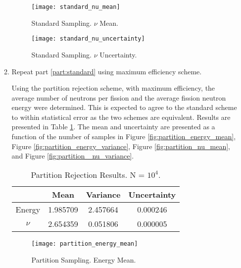 \documentclass{article}
\begin{document}
\begin{enumerate}
\begin{enumerate}
        
        \begin{figure}[H]
          \centering
          \texttt{[image: standard\_nu\_mean]}
          \caption{Standard Sampling. $\nu$ Mean.}
          \label{fig:standard_nu_mean}
        \end{figure}

        \begin{figure}[H]
          \centering
          \texttt{[image: standard\_nu\_uncertainty]}
          \caption{Standard Sampling. $\nu$ Uncertainty.}
          \label{fig:standard_nu_uncertainty}
        \end{figure}

      \item Repeat part \ref{part:standard} using maximum efficiency scheme.
      
        Using the partition rejection scheme, with maximum efficiency, 
        the average number of neutrons per fission and the average fission 
        neutron energy were determined. This is expected to agree to the 
        standard scheme to within statistical error as the two schemes are 
        equivalent. Results are presented in Table \ref{tab:partition}. The 
        mean and uncertainty are presented as a function of the number 
        of samples in Figure \ref{fig:partition_energy_mean}, Figure 
        \ref{fig:partition_energy_variance}, Figure \ref{fig:partition_nu_mean},
        and Figure \ref{fig:partition _nu_variance}. 
        
        \begin{table}[H]
          \caption{Partition Rejection Results. N = $10^4$.}
          \label{tab:partition}
          \begin{center}
          \begin{tabular}{cccc}
            & Mean & Variance & Uncertainty \\
            \midrule
            Energy & 1.985709&  2.457664&  0.000246\\
            $\nu$  & 2.654359&  0.051806&  0.000005
          \end{tabular}
          \end{center}
        \end{table}

        \begin{figure}[H]
          \centering
          \texttt{[image: partition\_energy\_mean]}
          \caption{Partition Sampling. Energy Mean.}
          \label{fig:partition_scheme_energy_mean}
        \end{figure}


\end{enumerate}
\end{enumerate}
\end{document}
